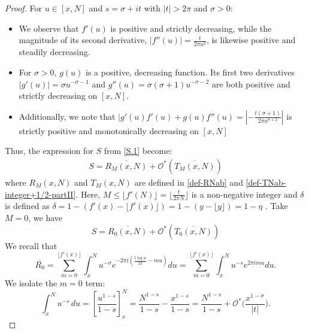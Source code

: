 \documentclass[11pt,letterpaper,oneside,reqno]{amsart}
\renewcommand{\^}[1]{\widehat{#1}}
\newcommand{\s}{\sigma}
\numberwithin{equation}{section}
\theoremstyle{remark}
\begin{document}
\begin{proof}
For $u \in [x, N]$ and $s = \sigma + it$ with $|t| > 2\pi$ and $\sigma > 0$:
\begin{itemize}
    \item %
    We observe that $f'(u)$ is positive and strictly decreasing, while the magnitude of its second derivative, $|f''(u)| = \frac{t}{2\pi u^2}$, is likewise positive and steadily decreasing.
    \item %
    For $\sigma > 0$, $g(u)$ is a positive, decreasing function. Its first two derivatives $|g'(u)| = \sigma u^{-\sigma-1}$ and $g''(u) = \sigma(\sigma+1)u^{-\sigma-2}$ are both positive and strictly decreasing on $[x, N]$.
    \item Additionally, we note that 
    $  |g'(u)f'(u) + g(u)f''(u) %
    = \left|-\frac{t(\sigma+1)}{2\pi u^{\sigma+2}}\right|$ is  strictly positive and monotonically decreasing on $[x, N]$
\end{itemize}
%
Thus, the expression for 
$S$ from \eqref{S.1} become:
\begin{equation}
\begin{split}
S= \overline{R_M(x,N)}+\mathcal{O}^*(\overline{T_M(x,N)})
\label{Euler-Zeta-EF2}
    \end{split}
\end{equation}
where
$R_M(x,N)$ and $T_M(x,N)$ are defined in \eqref{def-RNab} and \eqref{def-TNab-integer+1/2-partII}.
Here, $M\leq \lfloor f'(N)\rfloor=\lfloor \frac{t}{2 \pi N} \rfloor  $ is a non-negative integer and $\delta$ is defined as  $\delta = 1- (f'(x)-\lfloor f'(x) \rfloor) = 1 - (y -\lfloor y \rfloor) = 1 - \eta$ . Take $M=0$, we have
\begin{equation}
    S = \overline{R_0(x,N)}+\mathcal{O}^*(\overline{T_0(x,N)})
\label{S}
\end{equation}
%
We recall that $$\overline{R_0}=\sum_{m=0}^{\lfloor f'(x) \rfloor} \int_x^N u^{-\s}e^{-{2\pi i(\frac{t \log u}{2 \pi }-m u)}} du= \sum_{m=0}^{\lfloor f'(x) \rfloor} \int_x^N u^{-s}e^{2\pi im u} du.$$ We  isolate the $m=0$ term:
\begin{equation}
\int_x^N u^{-s} \,du = \left[\frac{u^{1-s}}{1-s}\right]_x^N = \frac{N^{1-s}}{1-s} - \frac{x^{1-s}}{1-s}=\frac{N^{1-s}}{1-s}+\mathcal{O}^*\bigg(\frac{x^{1-\sigma}}{|t|}\bigg). \label{eq:int_xtoN(m=0)}
\end{equation}

\end{proof}
\end{document}
